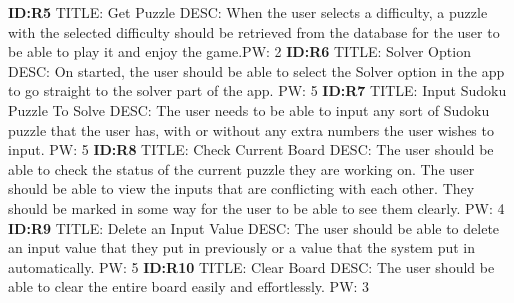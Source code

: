 \documentclass{article}
\begin{document}
\textbf{ID:R5} \newline TITLE: Get Puzzle \newline DESC: When the user selects a difficulty, a puzzle with the selected difficulty should be retrieved from the database for the user to be able to play it and enjoy the game.\newline PW: 2 \newline \newline
\textbf{ID:R6} \newline TITLE: Solver Option \newline DESC: On started, the user should be able to select the Solver option in the app to go straight to the solver part of the app. \newline PW: 5 \newline \newline
\textbf{ID:R7} \newline TITLE: Input Sudoku Puzzle To Solve \newline DESC: The user needs to be able to input any sort of Sudoku puzzle that the user has, with or without any extra numbers the user wishes to input. \newline PW: 5 \newline \newline
\textbf{ID:R8} \newline TITLE: Check Current Board \newline DESC: The user should be able to check the status of the current puzzle they are working on. The user should be able to view the inputs that are conflicting with each other. They should be marked in some way for the user to be able to see them clearly. \newline PW: 4 \newline \newline
\textbf{ID:R9} \newline TITLE: Delete an Input Value \newline DESC: The user should be able to delete an input value that they put in previously or a value that the system put in automatically. \newline PW: 5 \newline \newline
\textbf{ID:R10} \newline TITLE: Clear Board \newline DESC: The user should be able to clear the entire board easily and effortlessly. \newline PW: 3 \newline \newline
\end{document}
